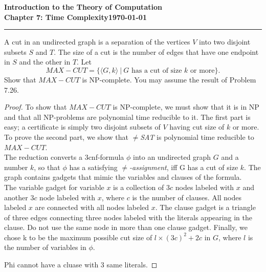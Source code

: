 \documentclass[11pt]{article}
\newcommand{\dated}{\today}
\begin{document}
\textbf{Introduction to the Theory of
Computation}\hfill\textbf{\myname}\\[0.01in]
\textbf{Chapter 7: Time Complexity}\hfill\textbf{\dated}\\
\smallskip\hrule\bigskip

\begin{problem}{7.27}
A cut in an undirected graph is a separation of the vertices $V$ into two disjoint
subsets $S$ and $T$. The size of a cut is the number of edges that have one endpoint
in $S$ and the other in $T$. Let
\[
MAX-CUT = \{\langle G, k \rangle \ | \ G \text{ has a cut of size } k \text{ or more}\}.
\]
Show that $MAX-CUT$ is NP-complete. You may assume the result of Problem 7.26.
\end{problem}

\begin{proof}
To show that $MAX-CUT$ is NP-complete, we must show that it is in NP and that all NP-problems are polynomial time reducible to it. The first part is easy; a certificate is simply two disjoint subsets of $V$ having cut size of $k$ or more. To prove the second part, we show that $\neq$\textit{SAT} is polynomial time reducible to $MAX-CUT$. \\

The reduction converts a 3cnf-formula $\phi$ into an undirected graph $G$ and
a number $k$, so that $\phi$ has a satisfying $\neq$\textit{-assignment}, iff G has a cut of size $k$. The graph contains gadgets that mimic the variables and clauses of the formula. \\

The variable gadget for variable $x$ is a collection of $3c$ nodes labeled with $x$ and another $3c$ node labeled with $x$, where $c$ is the number of clauses. All nodes labeled $x$ are connected with all nodes labeled $x$. The clause gadget is a triangle of three edges connecting three nodes labeled with the literals appearing in the clause. Do not use the same node in more than one clause gadget. Finally, we chose k to be the maximum possible cut size of $l \times (3c)^2 + 2c$ in $G$, where $l$ is the number of variables in $\phi$.

Phi cannot have a cluase with 3 same literals.

\end{proof}
\end{document}
